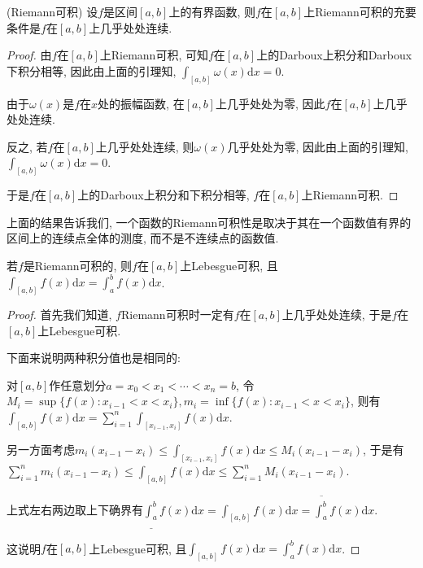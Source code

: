 \documentclass[theorem=false,mathfont=none,openany,sub3section]{easybook}
\begin{document}
\begin{theorem}
  (Riemann可积) 设$f$是区间$[a,b]$上的有界函数, 则$f$在$[a,b]$上Riemann可积的充要条件是$f$在$[a,b]$上几乎处处连续.\par
\end{theorem}

\begin{proof}
  由$f$在$[a,b]$上Riemann可积, 可知$f$在$[a,b]$上的Darboux上积分和Darboux下积分相等, 因此由上面的引理知, $\int_{[a,b]}\omega(x)\mathrm{d}x=0$.\par
  由于$\omega(x)$是$f$在$x$处的振幅函数, 在$[a,b]$上几乎处处为零, 因此$f$在$[a,b]$上几乎处处连续.\par
  反之, 若$f$在$[a,b]$上几乎处处连续, 则$\omega(x)$几乎处处为零, 因此由上面的引理知, $\int_{[a,b]}\omega(x)\mathrm{d}x=0$.\par
  于是$f$在$[a,b]$上的Darboux上积分和下积分相等, $f$在$[a,b]$上Riemann可积.\par
\end{proof}

\begin{remark}
  上面的结果告诉我们, 一个函数的Riemann可积性是取决于其在一个函数值有界的区间上的连续点全体的测度, 而不是不连续点的函数值.\par
\end{remark}

\begin{theorem}
  若$f$是Riemann可积的, 则$f$在$[a,b]$上Lebesgue可积, 且$\int_{[a,b]}f(x)\mathrm{d}x=\int_{a}^{b}f(x)\mathrm{d}x$.\par
\end{theorem}

\begin{proof}
  首先我们知道, $f$Riemann可积时一定有$f$在$[a,b]$上几乎处处连续, 于是$f$在$[a,b]$上Lebesgue可积.\par
  下面来说明两种积分值也是相同的:\par
  对$[a,b]$作任意划分$a=x_0<x_1<\cdots<x_n=b$, 令$M_i=\sup \{f(x): x_{i-1}<x<x_{i}\}, m_i=\inf \{f(x): x_{i-1}<x<x_{i}\}$, 则有$\int_{[a,b]}f(x)\mathrm{d}x=\sum_{i=1}^{n}\int_{[x_{i-1},x_i]}f(x)\mathrm{d}x$.\par
  另一方面考虑$m_i(x_{i-1}-x_{i})\leqslant \int_{[x_{i-1},x_i]}f(x)\mathrm{d}x\leqslant M_i(x_{i-1}-x_{i})$, 于是有$\sum_{i=1}^{n}m_i(x_{i-1}-x_{i})\leqslant \int_{[a,b]}f(x)\mathrm{d}x\leqslant \sum_{i=1}^{n}M_i(x_{i-1}-x_{i})$.\par
  上式左右两边取上下确界有$\underline{\int_{a}^{b}}f(x)\mathrm{d}x= \int_{[a,b]}f(x)\mathrm{d}x= \overline{\int_{a}^{b}}f(x)\mathrm{d}x$.\par
  这说明$f$在$[a,b]$上Lebesgue可积, 且$\int_{[a,b]}f(x)\mathrm{d}x=\int_{a}^{b}f(x)\mathrm{d}x$.\par
\end{proof}
\end{document}
